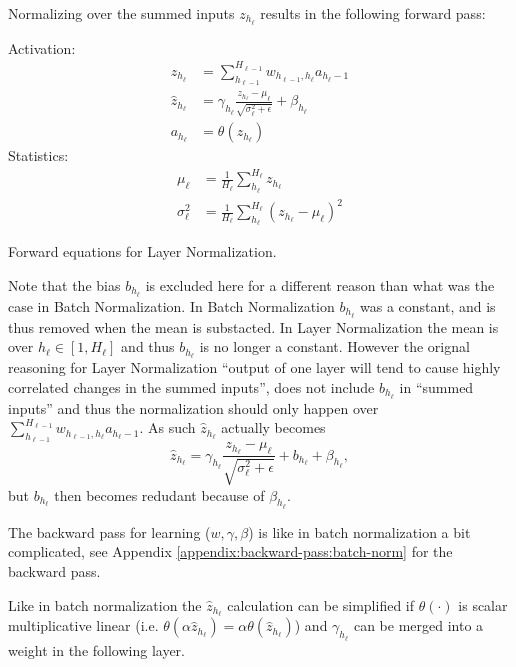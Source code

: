 Normalizing over the summed inputs $z_{h_\ell}$ results in the following forward pass:
\begin{equationbox}[H]
Activation:
\begin{equation*}
\begin{aligned}
z_{h_\ell} &= \sum_{h_{\ell-1}}^{H_{\ell-1}} w_{h_{\ell-1},h_\ell} a_{h_\ell-1} \\
\hat{z}_{h_\ell} &= \gamma_{h_\ell} \frac{z_{h_\ell} - \mu_{\ell}}{\sqrt{\sigma_{\ell}^2 + \epsilon}} + \beta_{h_\ell} \\
a_{h_\ell} &= \theta\left(z_{h_\ell}\right)
\end{aligned}
\end{equation*}
Statistics:
\begin{equation*}
\begin{aligned}
\mu_{\ell} &= \frac{1}{H_\ell} \sum_{h_\ell}^{H_\ell} z_{h_\ell} \\
\sigma_{\ell}^2 &= \frac{1}{H_\ell} \sum_{h_\ell}^{H_\ell} (z_{h_\ell} - \mu_{\ell})^2
\end{aligned}
\end{equation*}
\caption{Forward equations for Layer Normalization.}
\end{equationbox}

Note that the bias $b_{h_\ell}$ is excluded here for a different reason than what was the case in Batch Normalization. In Batch Normalization $b_{h_\ell}$ was a constant, and is thus removed when the mean is substacted. In Layer Normalization the mean is over $h_\ell \in [1, H_\ell]$ and thus $b_{h_\ell}$ is no longer a constant. However the orignal reasoning for Layer Normalization ``output of one layer will tend to cause highly correlated changes in the summed inputs'', does not include $b_{h_\ell}$ in ``summed inputs'' and thus the normalization should only happen over $\sum_{h_{\ell-1}}^{H_{\ell-1}} w_{h_{\ell-1},h_\ell} a_{h_\ell-1}$. As such $\hat{z}_{h_\ell}$ actually becomes
\begin{equation*}
\hat{z}_{h_\ell} = \gamma_{h_\ell} \frac{z_{h_\ell} - \mu_{\ell}}{\sqrt{\sigma_{\ell}^2 + \epsilon}} + b_{h_\ell} + \beta_{h_\ell},
\end{equation*}
but $ b_{h_\ell}$ then becomes redudant because of $\beta_{h_\ell}$.

The backward pass for learning ($w, \gamma, \beta$) is like in batch normalization a bit complicated, see Appendix \ref{appendix:backward-pass:batch-norm} for the backward pass.

Like in batch normalization the $\hat{z}_{h_\ell}$ calculation can be simplified if $\theta(\cdot)$ is scalar multiplicative linear (i.e. $\theta(\alpha \hat{z}_{h_\ell}) = \alpha \theta(\hat{z}_{h_\ell})$) and $\gamma_{h_\ell}$ can be merged into a weight in the following layer.

